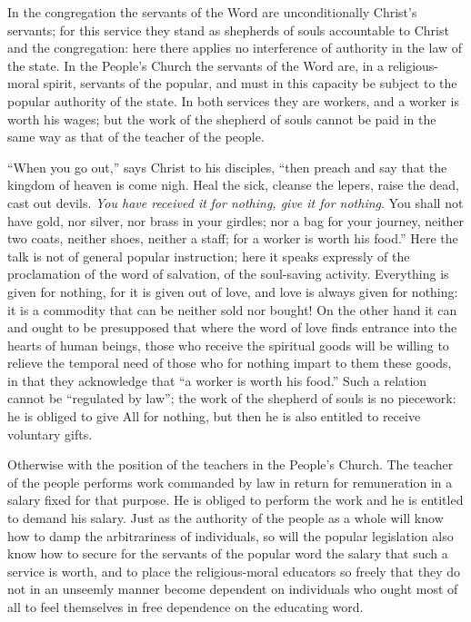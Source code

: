 \documentclass[12pt,a4paper,openany]{book}
\newcommand{\opage}[1]{\marginnote{\footnotesize\textit{[#1]}}}
\begin{document}
In the congregation the servants of the Word are unconditionally Christ's
servants; for this service they stand as shepherds of souls
accountable to Christ and the congregation: here there applies
no interference of authority in the law of the state. In the People's Church
the servants of the Word are, in a religious-moral spirit, servants of
the popular, and must in this capacity be subject to
the popular authority of the state. In both services
they are workers, and a worker is worth his wages;
but the work of the shepherd of souls cannot be paid in the same
way as that of the teacher of the people.

``When you go out,'' says Christ to his disciples,
``then preach and say that the kingdom of heaven is come
nigh. Heal the sick, cleanse the lepers, raise
the dead, cast out devils. \emph{You have received it}
\emph{for nothing, give it for nothing}. You shall not have
gold, nor silver, nor brass in your girdles; nor a bag
for your journey, neither two coats, neither shoes, neither
a staff; for a worker is worth his food.'' Here
the talk is not of general popular instruction; here
it speaks expressly of the proclamation of the word of salvation,
of the soul-saving activity. Everything is given for nothing,
for it is given out of love, and love is always given
for nothing: it is a commodity that can be neither sold nor
bought! On the other hand it can and ought to be presupposed that where
the word of love finds entrance into the hearts of human beings,
those who receive the spiritual goods will be willing
to relieve the temporal need of those who for
nothing impart to them these goods, in that they acknowledge that
\setcounter{footnote}{0}%
\opage{113}``a worker is worth his food.'' Such a relation
cannot be ``regulated by law''; the work of the shepherd of souls is
no piecework: he is obliged to give All
for nothing, but then he is also entitled to receive
voluntary gifts.

Otherwise with the position of the teachers in the People's Church.
The teacher of the people performs work commanded by law in return for remuneration
in a salary fixed for that purpose. He is obliged to
perform the work and he is entitled to demand his
salary. Just as the authority of the people as a whole will know
how to damp the arbitrariness of individuals, so will the
popular legislation also know how to secure for the servants of the popular
word the salary that such a service is
worth, and to place the religious-moral educators so freely
that they do not in an unseemly manner become dependent on
individuals who ought most of all to feel themselves in free dependence
on the educating word.
\end{document}
